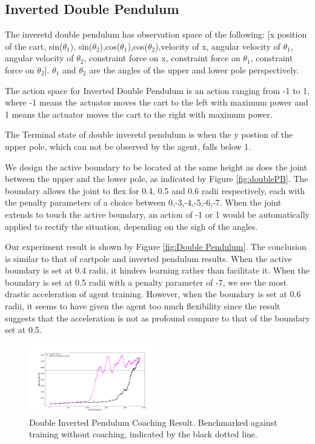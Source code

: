 \documentclass[journal]{IEEEtran}
\begin{document}
\subsection{Inverted Double Pendulum}
The inveretd double pendulum has observation space of the following: [x position of the cart, sin($\theta_1$), sin($\theta_2$),cos($\theta_1$),cos($\theta_2$),velocity of x, angular velocity of $\theta_1$, angular velocity of $\theta_2$, constraint force on x, constraint force on $\theta_1$, constraint force on $\theta_2$]. $\theta_1$ and $\theta_2$ are the angles of the upper and lower pole perspectively.

The action space for Inverted Double Pendulum is an action ranging from -1 to 1, where -1 means the actuator moves the cart to the left with maximum power and 1 means the actuator moves the cart to the right with maximum power.

The Terminal state of double inveretd pendulum is when the y postion of the upper pole, which can not be observed by the agent, falls below 1.

We design the active boundary to be located at the same height as does the joint between the upper and the lower pole, as indicated by Figure \ref{fig:doublePB}. The boundary allows the joint to flex for 0.4, 0.5 and 0.6 radii respectively, each with the penalty parameters of a choice between 0,-3,-4,-5,-6,-7. When the joint extends to touch the active boundary, an action of -1 or 1 would be automatically applied to rectify the situation, depending on the sigh of the angles.


Our experiment result is shown by Figure \ref{fig:Double Pendulum}. The conclusion is similar to that of cartpole and inverted pendulum results. When the active boundary is set at 0.4 radii, it hinders learning rather than facilitate it. When the boundary is set at 0.5 radii with a penalty parameter of -7, we see the most drastic acceleration of agent training. However, when the boundary is set at 0.6 radii, it seems to have given the agent too much flexibility since the result suggests that the acceleration is not as profound compare to that of the boundary set at 0.5.

\begin{figure}
     \centering
      \includegraphics[width=0.5\textwidth]{double.png}
      \caption{Double Inverted Pendulum Coaching Result. Benchmarked against training without coaching, indicated by the black dotted line.}
      \label{fig:double}
\end{figure}
\end{document}
